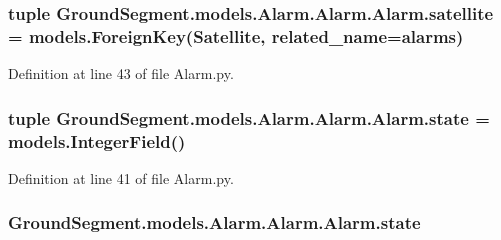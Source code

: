\hypertarget{class_ground_segment_1_1models_1_1_alarm_1_1_alarm_1_1_alarm_a605cb206ae2e10d3a552d9dd47f5ba58}{}
\subsubsection[{satellite}]{\setlength{\rightskip}{0pt plus 5cm}tuple Ground\+Segment.\+models.\+Alarm.\+Alarm.\+Alarm.\+satellite = models.\+Foreign\+Key({\bf Satellite}, related\+\_\+name=\textquotesingle{}alarms\textquotesingle{})\hspace{0.3cm}{\ttfamily [static]}}\label{class_ground_segment_1_1models_1_1_alarm_1_1_alarm_1_1_alarm_a605cb206ae2e10d3a552d9dd47f5ba58}


Definition at line 43 of file Alarm.\+py.

\hypertarget{class_ground_segment_1_1models_1_1_alarm_1_1_alarm_1_1_alarm_a567e2e2aa9906455d4678df229dac10c}{}
\subsubsection[{state}]{\setlength{\rightskip}{0pt plus 5cm}tuple Ground\+Segment.\+models.\+Alarm.\+Alarm.\+Alarm.\+state = models.\+Integer\+Field()\hspace{0.3cm}{\ttfamily [static]}}\label{class_ground_segment_1_1models_1_1_alarm_1_1_alarm_1_1_alarm_a567e2e2aa9906455d4678df229dac10c}


Definition at line 41 of file Alarm.\+py.

\hypertarget{class_ground_segment_1_1models_1_1_alarm_1_1_alarm_1_1_alarm_a485c4c559bb998a413e46817a9930b40}{}
\subsubsection[{state}]{\setlength{\rightskip}{0pt plus 5cm}Ground\+Segment.\+models.\+Alarm.\+Alarm.\+Alarm.\+state}\label{class_ground_segment_1_1models_1_1_alarm_1_1_alarm_1_1_alarm_a485c4c559bb998a413e46817a9930b40}


